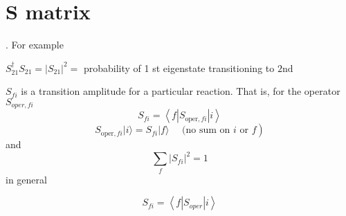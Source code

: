 \section{S matrix}
. For example
\begin{center}
    $S_{21}^{\dagger} S_{21}=\left|S_{21}\right|^{2}=$ probability of 1 st eigenstate transitioning to $2 \mathrm{nd}$
\end{center}
$S_{fi}$ is a transition amplitude for a particular reaction. That is, for the operator $S_{oper,fi}$
$$
S_{fi}=\left\langle f\left|S_{\text {oper}, fi}\right| i\right\rangle
$$
\begin{equation}
\left.S_{\text {oper}, f i}|i\rangle= S_{f i}|f\rangle \quad \text { (no sum on } i \text { or } f\right)
\end{equation}
and
\begin{equation}
\sum_{f}\left|S_{fi}\right|^{2}=1
\end{equation}
in general
\begin{qt}
\begin{equation}
S_{f i}=\left\langle f\left|S_{o p e r}\right| i\right\rangle
\end{equation}
\end{qt}
